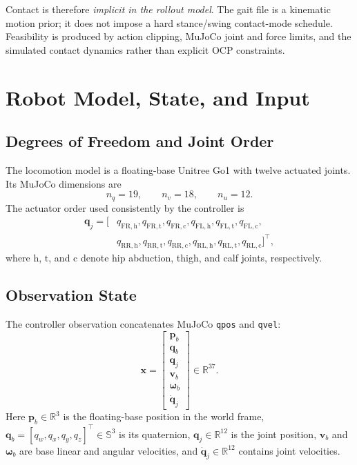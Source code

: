 \documentclass[11pt,a4paper]{article}
\newcommand{\R}{\mathbb{R}}
\newcommand{\code}[1]{\texttt{#1}}
\begin{document}
Contact is therefore \emph{implicit in the rollout model}.  The gait file is
a kinematic motion prior; it does not impose a hard stance/swing contact-mode
schedule.  Feasibility is produced by action clipping, MuJoCo joint and force
limits, and the simulated contact dynamics rather than explicit OCP
constraints.

\section{Robot Model, State, and Input}

\subsection{Degrees of Freedom and Joint Order}

The locomotion model is a floating-base Unitree Go1 with twelve actuated
joints.  Its MuJoCo dimensions are
\begin{equation}
  n_q=19, \qquad n_v=18, \qquad n_u=12.
\end{equation}
The actuator order used consistently by the controller is
\begin{align}
\bm{q}_j = [&q_{\mathrm{FR,h}},q_{\mathrm{FR,t}},q_{\mathrm{FR,c}},
q_{\mathrm{FL,h}},q_{\mathrm{FL,t}},q_{\mathrm{FL,c}}, \nonumber\\
&q_{\mathrm{RR,h}},q_{\mathrm{RR,t}},q_{\mathrm{RR,c}},
q_{\mathrm{RL,h}},q_{\mathrm{RL,t}},q_{\mathrm{RL,c}}]^\top ,
\end{align}
where $\mathrm{h}$, $\mathrm{t}$, and $\mathrm{c}$ denote hip abduction,
thigh, and calf joints, respectively.

\subsection{Observation State}

The controller observation concatenates MuJoCo \code{qpos} and \code{qvel}:
\begin{equation}
  \boxed{
  \bm{x}=
  \begin{bmatrix}
    \bm{p}_b\\
    \bm{q}_b\\
    \bm{q}_j\\
    \bm{v}_b\\
    \bm{\omega}_b\\
    \dot{\bm{q}}_j
  \end{bmatrix}
  \in\R^{37}.}
  \label{eq:state}
\end{equation}
Here $\bm{p}_b\in\R^3$ is the floating-base position in the world frame,
$\bm{q}_b=[q_w,q_x,q_y,q_z]^\top\in\mathbb{S}^3$ is its quaternion,
$\bm{q}_j\in\R^{12}$ is the joint position, $\bm{v}_b$ and
$\bm{\omega}_b$ are base linear and angular velocities, and
$\dot{\bm{q}}_j\in\R^{12}$ contains joint velocities.
\end{document}
